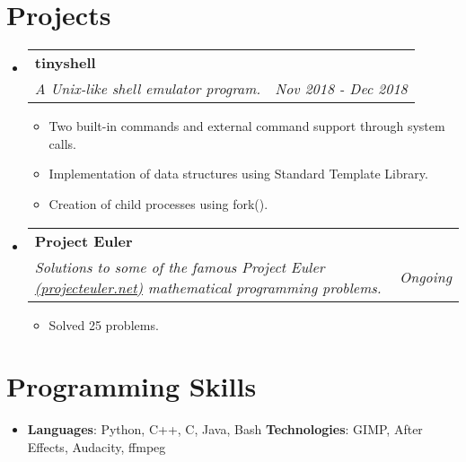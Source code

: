 \documentclass[letterpaper,11pt]{article}
\makeatletter
\newcommand{\resumeProheading}[3]{
  \vspace{-1pt}\item
    \begin{tabular*}{0.97\textwidth}[t]{l@{\extracolsep{\fill}}r}
      \textbf{#1} \\
      \textit{\small#2} & \textit{\small #3} \\
    \end{tabular*}\vspace{-5pt}
}
\newcommand{\resumeProItem}[1]{
  \item\small{
    {#1 \vspace{-2pt}}
  }
}
\newcommand{\resumeSubHeadingListStart}{\begin{itemize}[leftmargin=*]}
\newcommand{\resumeSubHeadingListEnd}{\end{itemize}}
\newcommand{\resumeItemListStart}{\begin{itemize}}
\newcommand{\resumeItemListEnd}{\end{itemize}\vspace{-5pt}}
\makeatother
\begin{document}
\section{Projects}
  \resumeSubHeadingListStart

    \resumeProheading
      {tinyshell}
      {A Unix-like shell emulator program.}{Nov 2018 - Dec 2018}
      \resumeItemListStart
        \resumeProItem
          {Two built-in commands and external command support through system calls.}
        \resumeProItem
          {Implementation of data structures using Standard Template Library.}
        \resumeProItem
          {Creation of child processes using fork().}
      \resumeItemListEnd
    \resumeProheading
      {Project Euler}
      {Solutions to some of the famous Project Euler \href{https://projecteuler.net}{(projecteuler.net)} mathematical programming problems.}{Ongoing}
      \resumeItemListStart
        \resumeProItem
          {Solved 25 problems.}
      \resumeItemListEnd
    
  \resumeSubHeadingListEnd

%
\section{Programming Skills}
  \resumeSubHeadingListStart
    \item{
      \textbf{Languages}{: Python, C++, C, Java, Bash}
      \hfill
      \textbf{Technologies}{: GIMP, After Effects, Audacity, ffmpeg}
    }
  \resumeSubHeadingListEnd


\end{document}
